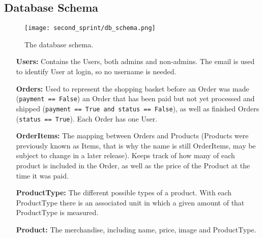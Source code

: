 \newpage

\subsection{Database Schema}

\begin{figure}[H]
  \centering
  \texttt{[image: second\_sprint/db\_schema.png]}
  \caption{\label{fig:schema} The database schema.}
\end{figure}

\begin{itemize}
  \item[\textbf{Users:}] Contains the Users, both admins and non-admins. The
    email is used to identify User at login, so no username is needed.
  \item[\textbf{Orders:}] Used to represent the shopping basket before an
    Order was made (\texttt{payment == False}) an Order that has
    been paid but not yet processed and shipped (\texttt{payment
    == True and status == False}), as well as finished Orders
    (\texttt{status == True}). Each Order has one User.
  \item[\textbf{OrderItems:}] The mapping between Orders and Products
    (Products were previously known as Items, that is why the name is still
    OrderItems, may be subject to change in a later release). Keeps track
    of how many of each product is included in the Order, as well as the
    price of the Product at the time it was paid.
  \item[\textbf{ProductType:}] The different possible types of a product. With
    each ProductType there is an associated unit in which a given amount
    of that ProductType is measured.
  \item[\textbf{Product:}] The merchandise, including name, price, image and
    ProductType.
\end{itemize}
